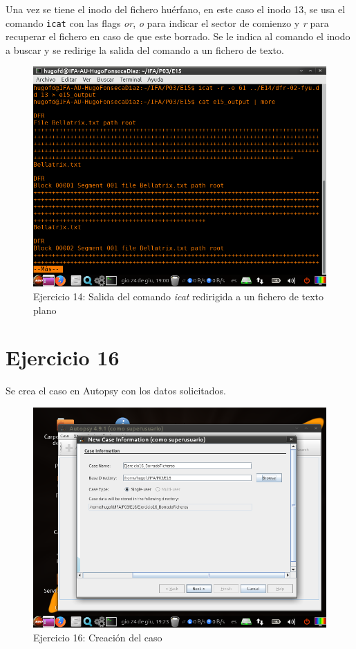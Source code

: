 \documentclass[11pt]{article}
\begin{document}
Una vez se tiene el inodo del fichero huérfano, en este caso el inodo 13, se usa el comando \verb|icat| con las flags \textit{or}, \textit{o} para indicar el sector de comienzo y \textit{r} para recuperar el fichero en caso de que este borrado. Se le indica al comando el inodo a buscar y se redirige la salida del comando a un fichero de texto.

\begin{figure}[H]
    \caption{Ejercicio 14: Salida del comando \textit{icat} redirigida a un fichero de texto plano}
    \centering
    \includegraphics[scale=0.7]{e15-2.png}
\end{figure}

\section{Ejercicio 16}
Se crea el caso en Autopsy con los datos solicitados.

\begin{figure}[H]
    \caption{Ejercicio 16: Creación del caso}
    \centering
    \includegraphics[scale=0.7]{e16-1.png}
\end{figure}
\end{document}
